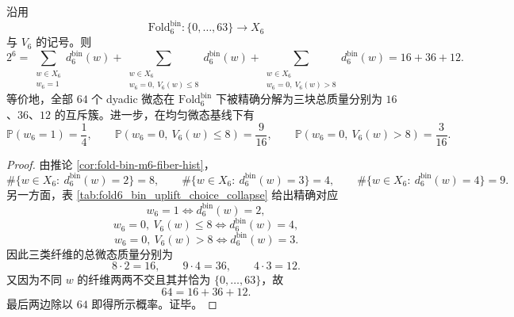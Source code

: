 \begin{theorem}\label{thm:xi-window6-dyadic-microstate-exact-three-block-mass-split}
沿用
\[
\mathrm{Fold}^{\mathrm{bin}}_6:\{0,\dots,63\}\to X_6
\]
与 \(V_6\) 的记号。则
\[
2^6
=
\sum_{\substack{w\in X_6\\ w_6=1}} d_6^{\mathrm{bin}}(w)
+
\sum_{\substack{w\in X_6\\ w_6=0,\ V_6(w)\le 8}} d_6^{\mathrm{bin}}(w)
+
\sum_{\substack{w\in X_6\\ w_6=0,\ V_6(w)>8}} d_6^{\mathrm{bin}}(w)
=
16+36+12.
\]
等价地，全部 \(64\) 个 dyadic 微态在 \(\mathrm{Fold}^{\mathrm{bin}}_6\) 下被精确分解为三块总质量分别为 \(16\)、\(36\)、\(12\) 的互斥簇。进一步，在均匀微态基线下有
\[
\mathbb P(w_6=1)=\frac14,\qquad
\mathbb P(w_6=0,\ V_6(w)\le 8)=\frac{9}{16},\qquad
\mathbb P(w_6=0,\ V_6(w)>8)=\frac{3}{16}.
\]
\end{theorem}
\begin{proof}
由推论 \ref{cor:fold-bin-m6-fiber-hist}，
\[
\#\{w\in X_6:\ d_6^{\mathrm{bin}}(w)=2\}=8,\qquad
\#\{w\in X_6:\ d_6^{\mathrm{bin}}(w)=3\}=4,\qquad
\#\{w\in X_6:\ d_6^{\mathrm{bin}}(w)=4\}=9.
\]
另一方面，表 \ref{tab:fold6_bin_uplift_choice_collapse} 给出精确对应
\[
w_6=1 \Longleftrightarrow d_6^{\mathrm{bin}}(w)=2,
\]
\[
w_6=0,\ V_6(w)\le 8 \Longleftrightarrow d_6^{\mathrm{bin}}(w)=4,
\]
\[
w_6=0,\ V_6(w)>8 \Longleftrightarrow d_6^{\mathrm{bin}}(w)=3.
\]
因此三类纤维的总微态质量分别为
\[
8\cdot 2=16,\qquad 9\cdot 4=36,\qquad 4\cdot 3=12.
\]
又因为不同 \(w\) 的纤维两两不交且其并恰为 \(\{0,\dots,63\}\)，故
\[
64=16+36+12.
\]
最后两边除以 \(64\) 即得所示概率。证毕。
\end{proof}

